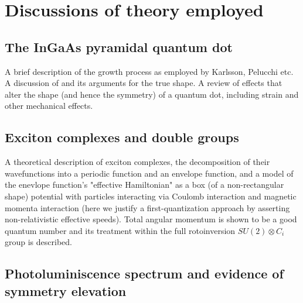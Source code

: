 \section{Discussions of theory employed}

\subsection{The InGaAs pyramidal quantum dot} \label{sec:growth}
A brief description of the growth process as employed by Karlsson, Pelucchi etc. A discussion of \cite{hexagon} and its arguments for the true shape. A review of effects that alter the shape (and hence the symmetry) of a quantum dot, including strain and other mechanical effects.

\subsection{Exciton complexes and double groups}
A theoretical description of exciton complexes, the decomposition of their wavefunctions into a periodic function and an envelope function, and a model of the enevlope function's "effective Hamiltonian" as a box (of a non-rectangular shape) potential with particles interacting via Coulomb interaction and magnetic momenta interaction (here we justify a first-quantization approach by asserting non-relativistic effective speeds). Total angular momentum is shown to be a good quantum number and its treatment within the full rotoinversion $SU(2)\otimes C_i$ group is described.

\subsection{Photoluminiscence spectrum and evidence of symmetry elevation}

